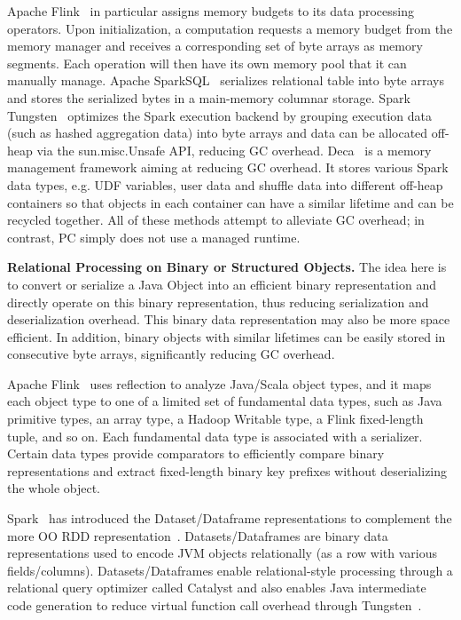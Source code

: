 Apache Flink~\cite{alexandrov2014stratosphere} in particular
assigns memory budgets to its data processing operators. Upon
initialization, a computation requests a memory budget from the
memory manager and receives a corresponding set of byte arrays as memory segments. 
Each operation will then have its own memory pool that it can manually
manage. 
Apache SparkSQL~\cite{armbrust2015spark} serializes 
relational table into byte arrays and stores the serialized bytes
in a main-memory columnar storage. Spark Tungsten~\cite{tungsten}
optimizes the Spark execution backend by grouping execution
data (such as hashed aggregation data) 
into byte arrays and data can be allocated off-heap via
the sun.misc.Unsafe API, reducing
GC overhead. Deca~\cite{lu2016lifetime} is a memory management framework aiming at
reducing GC overhead. It stores
various Spark data types, e.g. UDF variables, user data and
shuffle data into different
off-heap containers so that objects in each container can have a similar
lifetime and can be recycled together.
All of these methods attempt to alleviate GC overhead; in contrast, PC simply does
not use a managed runtime.

\vspace{5pt}
\noindent
\textbf{Relational Processing on Binary or Structured Objects.} The idea here is to convert or
serialize a Java Object into an efficient binary representation and directly
operate on this binary representation, thus reducing serialization and
deserialization overhead.  This 
binary data representation may also be more space efficient. In addition, binary objects
with similar lifetimes can be easily stored in consecutive byte
arrays, significantly reducing GC overhead.

Apache Flink~\cite{alexandrov2014stratosphere} uses reflection
to analyze Java/Scala object types, and it
maps each object type to one of a limited set of
fundamental data types, such as Java primitive types, an array type,
a Hadoop Writable type, a Flink fixed-length tuple, and so on. Each
fundamental data type is associated with a serializer.  Certain data
types provide comparators to efficiently compare binary
representations and extract fixed-length binary key prefixes without
deserializing the whole object.

Spark~\cite{tungsten} has introduced the Dataset/Dataframe representations
to complement the more OO 
RDD representation~\cite{zaharia2012resilient}. Datasets/Dataframes are
binary data representations used to encode JVM objects relationally (as a
row with various fields/columns). 
Datasets/Dataframes enable relational-style processing
through a relational query optimizer called Catalyst and
also enables Java intermediate code generation to reduce virtual
function call overhead through Tungsten~\cite{tungsten}. 

